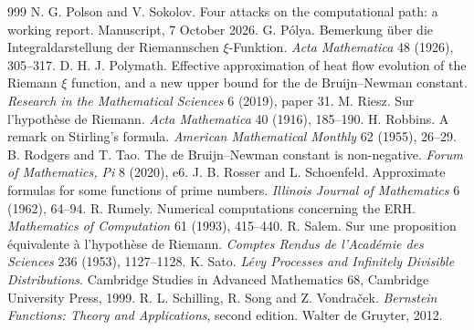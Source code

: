 \begin{thebibliography}{999}
 N. G. Polson and V. Sokolov. Four attacks on the computational path: a working report. Manuscript, 7 October 2026.
 G. P\'olya. Bemerkung \"uber die Integraldarstellung der Riemannschen $\xi$-Funktion. \emph{Acta Mathematica} 48 (1926), 305--317.
 D. H. J. Polymath. Effective approximation of heat flow evolution of the Riemann $\xi$ function, and a new upper bound for the de Bruijn--Newman constant. \emph{Research in the Mathematical Sciences} 6 (2019), paper 31.
 M. Riesz. Sur l'hypoth\`ese de Riemann. \emph{Acta Mathematica} 40 (1916), 185--190.
 H. Robbins. A remark on Stirling's formula. \emph{American Mathematical Monthly} 62 (1955), 26--29.
 B. Rodgers and T. Tao. The de Bruijn--Newman constant is non-negative. \emph{Forum of Mathematics, Pi} 8 (2020), e6.
 J. B. Rosser and L. Schoenfeld. Approximate formulas for some functions of prime numbers. \emph{Illinois Journal of Mathematics} 6 (1962), 64--94.
 R. Rumely. Numerical computations concerning the ERH. \emph{Mathematics of Computation} 61 (1993), 415--440.
 R. Salem. Sur une proposition \'equivalente \`a l'hypoth\`ese de Riemann. \emph{Comptes Rendus de l'Acad\'emie des Sciences} 236 (1953), 1127--1128.
 K. Sato. \emph{L\'evy Processes and Infinitely Divisible Distributions}. Cambridge Studies in Advanced Mathematics 68, Cambridge University Press, 1999.
 R. L. Schilling, R. Song and Z. Vondra\v{c}ek. \emph{Bernstein Functions: Theory and Applications}, second edition. Walter de Gruyter, 2012.

\end{thebibliography}
